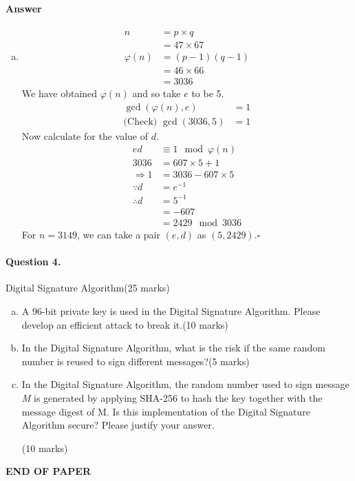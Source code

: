 \documentclass[12pt]{article}
\begin{document}
\paragraph{Answer}
\begin{enumerate}[(a)]
\item \begin{equation*}
\begin{split}
n&=p\times q\\
&=47\times 67\\
\varphi(n)&=(p-1)(q-1)\\
&=46\times 66\\
&=3036
\end{split}
\end{equation*}
We have obtained $\varphi(n)$ and so take $e$ to be 5.
\begin{equation*}
\begin{split}
\gcd(\varphi(n),e)&=1\\
\text{(Check) }\gcd(3036,5)&=1
\end{split}
\end{equation*}
Now calculate for the value of $d$.
\begin{equation*}
\begin{split}
ed&\equiv 1\mod \varphi(n)\\
3036&=607\times 5+1\\
\Rightarrow 1&=3036-607\times 5\\
\because d&=e^{-1}\\\therefore d&=5^{-1}\\&=-607\\&=2429\mod 3036
\end{split}
\end{equation*}
For $n=3149$, we can take a pair $(e,d)$ as $(5,2429).$\hfill $\square$
\end{enumerate}
\newpage
\paragraph{Question 4.}   Digital Signature Algorithm\hfill (25 marks)
\begin{enumerate}[(a)]
    \item A 96-bit private key is used in the Digital Signature Algorithm. Please develop an efficient attack to break it.\hfill (10 marks)
    \item In the Digital Signature Algorithm, what is the risk if the same random number is reused to sign different messages?\hfill (5 marks)
    \item In the Digital Signature Algorithm, the random number used to sign message \textit{M} is generated by applying SHA-256 to hash the key together with the message digest of M. Is this implementation of the Digital Signature Algorithm secure? Please justify your answer.{\vspace{-2.5em}\begin{flushright} (10 marks)\end{flushright}}
\end{enumerate}
\bigskip
\vfill
\begin{center}{\bf END OF PAPER}\end{center}
\end{document}
